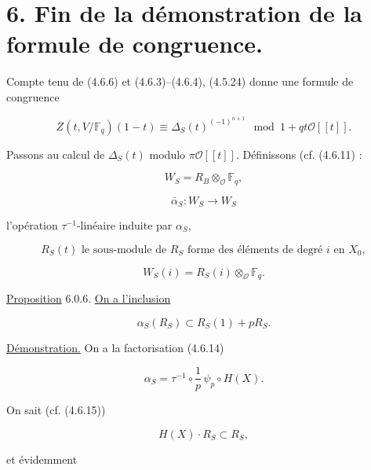 \section*{6. Fin de la démonstration de la formule de congruence.}

Compte tenu de (4.6.6) et (4.6.3)--(4.6.4), (4.5.24) donne une formule de
congruence

\begin{equation}\tag{6.0.1}
Z(t,V/\mathbb F_q)(1-t)
\equiv\Delta_S(t)^{(-1)^{n+1}}
\mod{1+qt\mathcal O[[t]]}.
\end{equation}

Passons au calcul de $\Delta_S(t)$ modulo $\pi\mathcal O[[t]]$. Définissons
(cf. (4.6.11) :

\begin{equation}\tag{6.0.2}
W_S=R_B\otimes_{\mathcal O}\mathbb F_q,
\end{equation}


\begin{equation}\tag{6.0.3}
\bar\alpha_S:W_S\longrightarrow W_S
\end{equation}

\noindent
l'opération $\tau^{-1}$-linéaire induite par $\alpha_S$,

\begin{equation}\tag{6.0.4}
R_S(t)\text{ le sous-module de $R_S$ forme des éléments de degré $i$ en $X_0$},
\end{equation}

\begin{equation}\tag{6.0.5}
W_S(i)=R_S(i)\otimes_{\mathcal O}\mathbb F_q.
\end{equation}

\underline{Proposition} 6.0.6.
\underline{On a l'inclusion}

\[
\alpha_S(R_S)\subset R_S(1)+pR_S.
\]

\underline{Démonstration.}
On a la factorisation (4.6.14)

\begin{equation}\tag{6.0.7}
\alpha_S=\tau^{-1}\circ\frac1p\,\psi_p\circ H(X).
\end{equation}

On sait (cf. (4.6.15))

\begin{equation}\tag{6.0.8}
H(X)\cdot R_S\subset R_S,
\end{equation}

et évidemment


